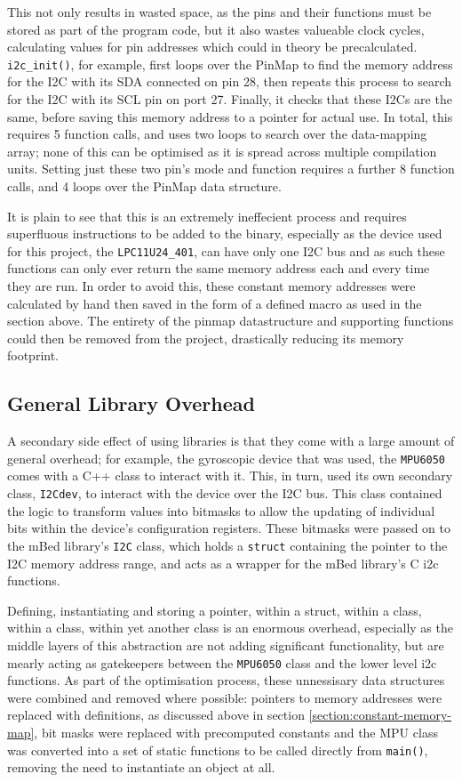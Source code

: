 This not only results in wasted space, as the pins and their functions must be stored as part of the program code, but it also wastes valueable clock cycles, calculating values for pin addresses which could in theory be precalculated. \verb|i2c_init()|, for example, first loops over the PinMap to find the memory address for the I2C with its SDA connected on pin 28, then repeats this process to search for the I2C with its SCL pin on port 27. Finally, it checks that these I2Cs are the same, before saving this memory address to a pointer for actual use. In total, this requires 5 function calls, and uses two loops to search over the data-mapping array; none of this can be optimised as it is spread across multiple compilation units. Setting just these two pin's mode and function requires a further 8 function calls, and 4 loops over the PinMap data structure.

It is plain to see that this is an extremely ineffecient process and requires superfluous instructions to be added to the binary, especially as the device used for this project, the \verb|LPC11U24_401|, can have only one I2C bus and as such these functions can only ever return the same memory address each and every time they are run. In order to avoid this, these constant memory addresses were calculated by hand then saved in the form of a defined macro as used in the section above. The entirety of the pinmap datastructure and supporting functions could then be removed from the project, drastically reducing its memory footprint.

\subsection{General Library Overhead}

A secondary side effect of using libraries is that they come with a large amount of general overhead; for example, the gyroscopic device that was used, the \verb|MPU6050| comes with a C++ class to interact with it. This, in turn, used its own secondary class, \verb|I2Cdev|, to interact with the device over the I2C bus. This class contained the logic to transform values into bitmasks to allow the updating of individual bits within the device's configuration registers. These bitmasks were passed on to the mBed library's \verb|I2C| class, which holds a \verb|struct| containing the pointer to the I2C memory address range, and acts as a wrapper for the mBed library's C i2c functions.

Defining, instantiating and storing a pointer, within a struct, within a class, within a class, within yet another class is an enormous overhead, especially as the middle layers of this abstraction are not adding significant functionality, but are mearly acting as gatekeepers between the \verb|MPU6050| class and the lower level i2c functions. As part of the optimisation process, these unnessisary data structures were combined and removed where possible: pointers to memory addresses were replaced with definitions, as discussed above in section \ref{section:constant-memory-map}, bit masks were replaced with precomputed constants and the MPU class was converted into a set of static functions to be called directly from \verb|main()|, removing the need to instantiate an object at all.